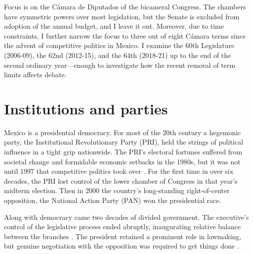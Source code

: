 \documentclass[letter,12pt]{article}
\begin{document}
Focus is on the Cámara de Diputados of the bicameral Congress. The chambers have symmetric powers over most legislation, but the Senate is excluded from adoption of the annual budget, and I leave it out. Moreover, due to time constraints, I further narrow the focus to three out of eight Cámara terms since the advent of competitive politics in Mexico. I examine the 60th Legislature (2006-09), the 62nd (2012-15), and the 64th (2018-21) up to the end of the second ordinary year---enough to investigate how the recent removal of term limits affects debate.


\section{Institutions and parties} %


Mexico is a presidential democracy. For most of the 20th century a hegemonic party, the Institutional Revolutionary Party (PRI), held the strings of political influence in a tight grip nationwide. The PRI's electoral fortunes suffered from societal change and formidable economic setbacks in the 1980s, but it was not until 1997 that competitive politics took over \citep{scott.1959,cosio.villegas.1981,molinar.1991a,cornelius.1996}. For the first time in over six decades, the PRI lost control of the lower chamber of Congress in that year's midterm election. Then in 2000 the country's long-standing right-of-center opposition, the National Action Party (PAN) won the presidential race.  

Along with democracy came two decades of divided government. The executive's control of the legislative process ended abruptly, inaugurating relative balance between the branches \citep{weldon.1997,lujambio.1996}. The president retained a prominent role in lawmaking, but genuine negotiation with the opposition was required to get things done \citep{bejarQuienLegisla2012}. 
\end{document}
